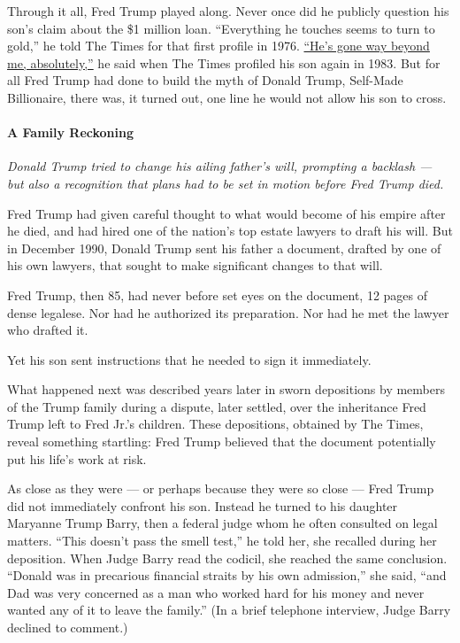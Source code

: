 Through it all, Fred Trump played along. Never once did he publicly
question his son's claim about the \$1 million loan. ``Everything he
touches seems to turn to gold,'' he told The Times for that first
profile in 1976.
\href{https://www.nytimes3xbfgragh.onion/1983/08/07/business/the-empire-and-ego-of-donald-trump.html}{``He's
gone way beyond me, absolutely,''} he said when The Times profiled his
son again in 1983. But for all Fred Trump had done to build the myth of
Donald Trump, Self-Made Billionaire, there was, it turned out, one line
he would not allow his son to cross.

\hypertarget{a-family-reckoning}{%
\paragraph{A Family Reckoning}\label{a-family-reckoning}}

\emph{Donald Trump tried to change his ailing father's will, prompting a
backlash --- but also a recognition that plans had to be set in motion
before Fred Trump died.}

Fred Trump had given careful thought to what would become of his empire
after he died, and had hired one of the nation's top estate lawyers to
draft his will. But in December 1990, Donald Trump sent his father a
document, drafted by one of his own lawyers, that sought to make
significant changes to that will.

Fred Trump, then 85, had never before set eyes on the document, 12 pages
of dense legalese. Nor had he authorized its preparation. Nor had he met
the lawyer who drafted it.

Yet his son sent instructions that he needed to sign it immediately.

What happened next was described years later in sworn depositions by
members of the Trump family during a dispute, later settled, over the
inheritance Fred Trump left to Fred Jr.'s children. These depositions,
obtained by The Times, reveal something startling: Fred Trump believed
that the document potentially put his life's work at risk.

As close as they were --- or perhaps because they were so close --- Fred
Trump did not immediately confront his son. Instead he turned to his
daughter Maryanne Trump Barry, then a federal judge whom he often
consulted on legal matters. ``This doesn't pass the smell test,'' he
told her, she recalled during her deposition. When Judge Barry read the
codicil, she reached the same conclusion. ``Donald was in precarious
financial straits by his own admission,'' she said, ``and Dad was very
concerned as a man who worked hard for his money and never wanted any of
it to leave the family.'' (In a brief telephone interview, Judge Barry
declined to comment.)

